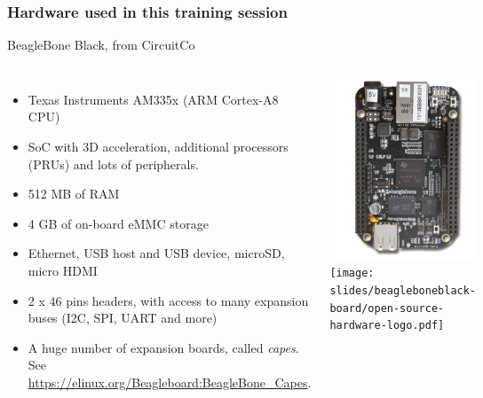 \begin{frame}
\frametitle{Hardware used in this training session}
  BeagleBone Black, from CircuitCo
  \begin{columns}
    \footnotesize
    \begin{itemize}
      \item Texas Instruments AM335x (ARM Cortex-A8 CPU)
      \item SoC with 3D acceleration, additional processors
        (PRUs) and lots of peripherals.
      \item 512 MB of RAM
      \item 4 GB of on-board eMMC storage
      \item Ethernet, USB host and USB device, microSD, micro HDMI
      \item 2 x 46 pins headers, with access to many expansion buses
        (I2C, SPI, UART and more)
      \item A huge number of expansion boards, called {\em capes}.
        See \url{https://elinux.org/Beagleboard:BeagleBone_Capes}.
    \end{itemize}
    \begin{center}
      \includegraphics[width=\textwidth]{slides/beagleboneblack-board/beagleboneblack.png}\\
      \texttt{[image: slides/beagleboneblack-board/open-source-hardware-logo.pdf]}
    \end{center}
  \end{columns}
\end{frame}
